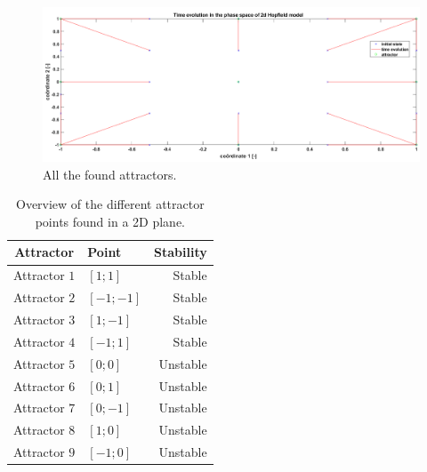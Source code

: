 \documentclass[a4paper,10pt]{article}
\begin{document}
\begin{figure}[h!]
	\centering
	\includegraphics[width=1.\textwidth]{rep2Attractors.png}
	\caption{All the found attractors.}
	\label{fig:rep2Attractors}
\end{figure}


\begin{table}
	\centering
	\begin{tabular}{@{}clr@{}} \toprule
		\textbf{Attractor} & \textbf{Point} & \textbf{Stability}\\\midrule
		Attractor $ 1 $ & $ [1;1] $ & Stable\\
		Attractor $ 2 $ & $ [-1;-1] $ & Stable\\
		Attractor $ 3 $ & $ [1;-1] $ & Stable\\
		Attractor $ 4 $ & $ [-1;1] $ & Stable\\
		Attractor $ 5 $ & $ [0;0] $ & Unstable\\
		Attractor $ 6 $ & $ [0;1] $ & Unstable\\
		Attractor $ 7 $ & $ [0;-1] $ & Unstable\\
		Attractor $ 8 $ & $ [1;0] $ & Unstable\\
		Attractor $ 9 $ & $ [-1;0] $ & Unstable\\\bottomrule
	\end{tabular}
	\caption{Overview of the different attractor points found in a 2D plane.}
	\label{tab:att}
\end{table}
\end{document}
